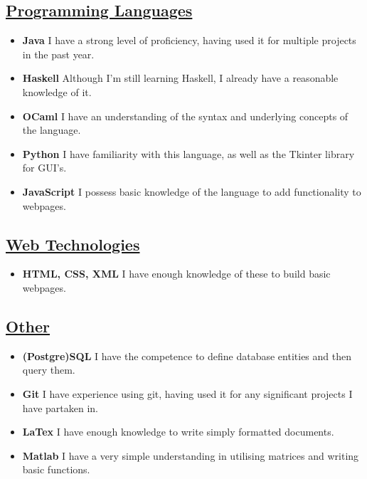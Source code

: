 \documentclass[11pt]{article}
\begin{document}
		\subsection*{\underline{Programming Languages}}
		\begin{itemize}
			\item \textbf{Java} I have a strong level of proficiency, having used it for multiple projects in the past year.
			\item \textbf{Haskell} Although I'm still learning Haskell, I already have a reasonable knowledge of it.
			\item \textbf{OCaml} I have an understanding of the syntax and underlying concepts of the language.
			\item \textbf{Python} I have familiarity with this language, as well as the Tkinter library for GUI's. 
			\item \textbf{JavaScript} I possess basic knowledge of the language to add functionality to webpages.
		\end{itemize} 
		\subsection*{\underline{Web Technologies}}
		\begin{itemize}
			\item \textbf{HTML, CSS, XML} I have enough knowledge of these to build basic webpages.
		\end{itemize}
		\subsection*{\underline{Other}}
		\begin{itemize}
			\item \textbf{(Postgre)SQL} I have the competence to define database entities and then query them.
			\item \textbf{Git} I have experience using git, having used it for any significant projects I have partaken in.
			\item \textbf{LaTex} I have enough knowledge to write simply formatted documents.
			\item \textbf{Matlab} I have a very simple understanding in utilising matrices and writing basic functions.
		\end{itemize}
\end{document}
